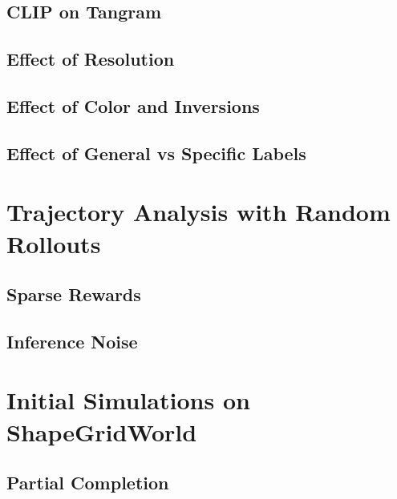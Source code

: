 \subsection{CLIP on Tangram}
\label{sec:clip-tangram}


\subsection{Effect of Resolution}
\label{sec:clip-resolution}


\subsection{Effect of Color and Inversions}
\label{sec:clip-color}


\subsection{Effect of General vs Specific Labels}
\label{sec:clip-labels}




\section{Trajectory Analysis with Random Rollouts}
\label{sec:random-rollouts}


\subsection{Sparse Rewards} %
\label{sec:sparse-rewards}


\subsection{Inference Noise} %
\label{sec:inference-noise}



\section{Initial Simulations on ShapeGridWorld}
\label{sec:sgw-simulations}

\subsection{Partial Completion}
\label{sec:partial-completion}



